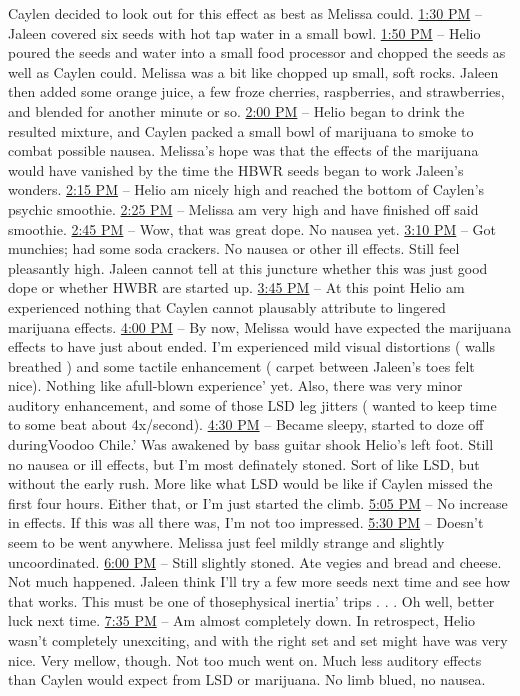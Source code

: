 \documentclass[12pt]{book}
\begin{document}
Caylen decided to look out for this effect as best as Melissa could. \underline{1:30 PM} -- Jaleen covered six seeds with hot tap water in a small bowl. \underline{1:50 PM} -- Helio poured the seeds and water into a small food processor and chopped the seeds as well as Caylen could. Melissa was a bit like chopped up small, soft rocks. Jaleen then added some orange juice, a few froze cherries, raspberries, and strawberries, and blended for another minute or so. \underline{2:00 PM} -- Helio began to drink the resulted mixture, and Caylen packed a small bowl of marijuana to smoke to combat possible nausea. Melissa's hope was that the effects of the marijuana would have vanished by the time the HBWR seeds began to work Jaleen's wonders. \underline{2:15 PM} -- Helio am nicely high and reached the bottom of Caylen's psychic smoothie. \underline{2:25 PM} -- Melissa am very high and have finished off said smoothie. \underline{2:45 PM} -- Wow, that was great dope. No nausea yet. \underline{3:10 PM} -- Got munchies; had some soda crackers. No nausea or other ill effects. Still feel pleasantly high. Jaleen cannot tell at this juncture whether this was just good dope or whether HWBR are started up. \underline{3:45 PM} -- At this point Helio am experienced nothing that Caylen cannot plausably attribute to lingered marijuana effects. \underline{4:00 PM} -- By now, Melissa would have expected the marijuana effects to have just about ended. I'm experienced mild visual distortions ( walls breathed ) and some tactile enhancement ( carpet between Jaleen's toes felt nice). Nothing like afull-blown experience' yet. Also, there was very minor auditory enhancement, and some of those LSD leg jitters ( wanted to keep time to some beat about 4x/second). \underline{4:30 PM} -- Became sleepy, started to doze off duringVoodoo Chile.' Was awakened by bass guitar shook Helio's left foot. Still no nausea or ill effects, but I'm most definately stoned. Sort of like LSD, but without the early rush. More like what LSD would be like if Caylen missed the first four hours. Either that, or I'm just started the climb. \underline{5:05 PM} -- No increase in effects. If this was all there was, I'm not too impressed. \underline{5:30 PM} -- Doesn't seem to be went anywhere. Melissa just feel mildly strange and slightly uncoordinated. \underline{6:00 PM} -- Still slightly stoned. Ate vegies and bread and cheese. Not much happened. Jaleen think I'll try a few more seeds next time and see how that works. This must be one of thosephysical inertia' trips . . .  Oh well, better luck next time. \underline{7:35 PM} -- Am almost completely down. In retrospect, Helio wasn't completely unexciting, and with the right set and set might have was very nice. Very mellow, though. Not too much went on. Much less auditory effects than Caylen would expect from LSD or marijuana. No limb blued, no nausea.
\end{document}
